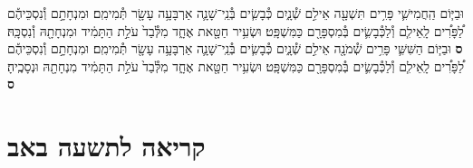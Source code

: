 \documentclass[twoside, openany, parskip=half, 11pt]{book}
\begin{document}
\begin{footnotesize}
\begin{multicols}{2}
וּבַיּ֧וֹם הַֽחֲמִישִׁ֛י פָּרִ֥ים תִּשְׁעָ֖ה אֵילִ֣ם שְׁ֯נָ֑יִם כְּ֯בָשִׂ֧ים בְּ֯נֵֽי־שָׁנָ֛ה אַרְבָּעָ֥ה עָשָׂ֖ר תְּ֯מִימִֽם׃ וּמִנְחָתָ֣ם וְ֯נִסְכֵּיהֶ֡ם לַ֠פָּרִ֠ים לָֽאֵילִ֧ם וְ֯לַכְּ֯בָשִׂ֛ים בְּ֯מִסְפָּרָ֖ם כַּמִּשְׁפָּֽט׃ וּשְׂעִ֥יר חַטָּ֖את אֶחָ֑ד מִלְּ֯בַד֙ עֹלַ֣ת הַתָּמִ֔יד וּמִנְחָתָ֖הּ וְ֯נִסְכָּֽהּ׃ \textbf{ס}
וּבַיּ֧וֹם הַשִּׁשִּׁ֛י פָּרִ֥ים שְׁ֯מֹנָ֖ה אֵילִ֣ם שְׁ֯נָ֑יִם כְּ֯בָשִׂ֧ים בְּ֯נֵֽי־שָׁנָ֛ה אַרְבָּעָ֥ה עָשָׂ֖ר תְּ֯מִימִֽם׃ וּמִנְחָתָ֣ם וְ֯נִסְכֵּיהֶ֡ם לַ֠פָּרִ֠ים לָֽאֵילִ֧ם וְ֯לַכְּ֯בָשִׂ֛ים בְּ֯מִסְפָּרָ֖ם כַּמִּשְׁפָּֽט׃ וּשְׂעִ֥יר חַטָּ֖את אֶחָ֑ד מִלְּ֯בַד֙ עֹלַ֣ת הַתָּמִ֔יד מִנְחָתָ֖הּ וּנְסָכֶֽיהָ׃ \textbf{ס}

\end{multicols}

\section[תשעה באב]{קריאה לתשעה באב}




\end{footnotesize}
\end{document}
